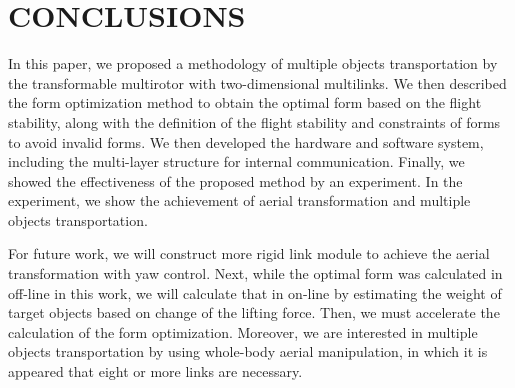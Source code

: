 \section{CONCLUSIONS}
In this paper, we proposed a methodology of multiple objects transportation by the transformable multirotor with two-dimensional multilinks. We then described the form optimization method to obtain the optimal form based on the flight stability, along with the definition of the flight stability and constraints of forms to avoid invalid forms. We then developed the hardware and software system, including the multi-layer structure for internal communication. Finally, we showed the effectiveness of the proposed method by an experiment. In the experiment, we show the achievement of aerial transformation and multiple objects transportation.
\par
For future work, we will construct more rigid link module to achieve the aerial transformation with yaw control. Next, while the optimal form was calculated in off-line in this work, we will calculate that in on-line by estimating the weight of target objects based on change of the lifting force. Then, we must accelerate the calculation of the form optimization. Moreover, we are interested in multiple objects transportation by using whole-body aerial manipulation\cite{ZhaoICRA2017}, in which it is appeared that eight or more links are necessary.
